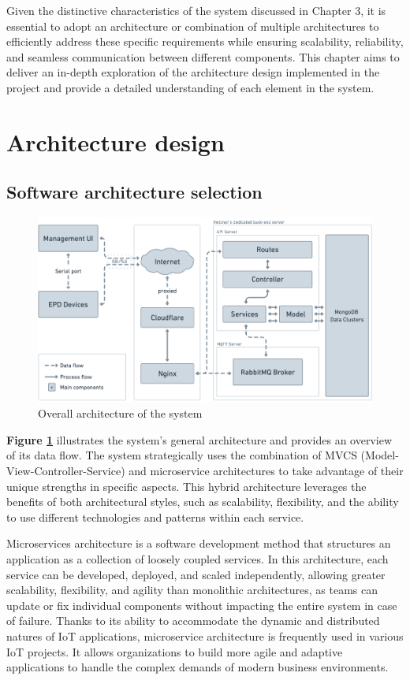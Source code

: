 \documentclass[../Main.tex]{subfiles}
\begin{document}
Given the distinctive characteristics of the system discussed in Chapter 3, it is essential to adopt an architecture or combination of multiple architectures to efficiently address these specific requirements while ensuring scalability, reliability, and seamless communication between different components. This chapter aims to deliver an in-depth exploration of the architecture design implemented in the project and provide a detailed understanding of each element in the system.
\section{Architecture design}
\subsection{Software architecture selection}
\begin{figure}[H]
    \centering
    \includegraphics[scale=0.46]{doc/thesis/EN/imgs/overall-architecture.png}
    \caption{Overall architecture of the system}
    \label{fig:Fig1}
\end{figure}

\textbf{Figure \ref{fig:Fig1}} illustrates the system's general architecture and provides an overview of its data flow. The system strategically uses the combination of MVCS (Model-View-Controller-Service) and microservice architectures to take advantage of their unique strengths in specific aspects. This hybrid architecture leverages the benefits of both architectural styles, such as scalability, flexibility, and the ability to use different technologies and patterns within each service.

Microservices architecture is a software development method that structures an application as a collection of loosely coupled services. In this architecture, each service can be developed, deployed, and scaled independently, allowing greater scalability, flexibility, and agility than monolithic architectures, as teams can update or fix individual components without impacting the entire system in case of failure. Thanks to its ability to accommodate the dynamic and distributed natures of IoT applications, microservice architecture is frequently used in various IoT projects. It allows organizations to build more agile and adaptive applications to handle the complex demands of modern business environments.
\end{document}

